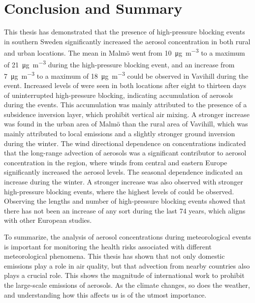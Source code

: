 \newpage
\section{Conclusion and Summary}
This thesis has demonstrated that the presence of high-pressure blocking events in southern Sweden significantly increased the aerosol concentration in both rural and urban locations. The mean \PM in Malmö went from \SI{10}{\micro\gram\per\meter\cubed} to a maximum of \SI{21}{\micro\gram\per\meter\cubed} during the high-pressure blocking event, and an increase from \SI{7}{\micro\gram\per\meter\cubed} to a maximum of \SI{18}{\micro\gram\per\meter\cubed} could be observed in Vavihill during the event. Increased levels of \PM were seen in both locations after eight to thirteen days of uninterrupted high-pressure blocking, indicating accumulation of aerosols during the events. This accumulation was mainly attributed to the presence of a subsidence inversion layer, which prohibit vertical air mixing. A stronger increase was found in the urban area of Malmö than the rural area of Vavihill, which was mainly attributed to local emissions and a slightly stronger ground inversion during the winter. The wind directional dependence on \PM concentrations indicated that the long-range advection of aerosols was a significant contributor to aerosol concentration in the region, where winds from central and eastern Europe significantly increased the aerosol levels. The seasonal dependence indicated an increase during the winter. A stronger increase was also observed with stronger high-pressure blocking events, where the highest levels of \PM could be observed. Observing the lengths and number of high-pressure blocking events showed that there has not been an increase of any sort during the last 74 years, which aligns with other European studies.

To summarize, the analysis of aerosol concentrations during meteorological events is important for monitoring the health risks associated with different meteorological phenomena. This thesis has shown that not only domestic emissions play a role in air quality, but that advection from nearby countries also plays a crucial role. This shows the magnitude of international work to prohibit the large-scale emissions of aerosols. As the climate changes, so does the weather, and understanding how this affects us is of the utmost importance.

